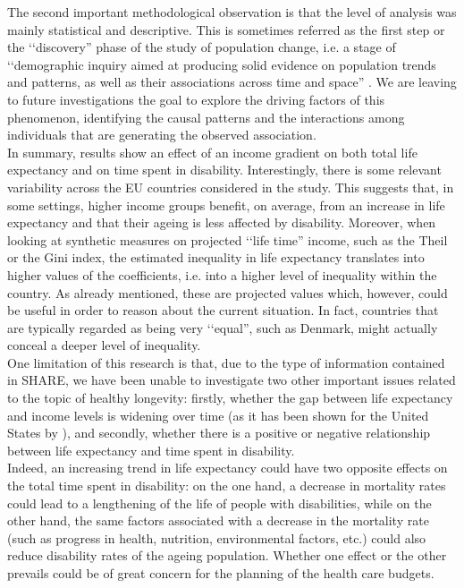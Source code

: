 The second important methodological observation is that the level of analysis was mainly statistical and descriptive. This is sometimes referred as the first step or the \lq\lq discovery'' phase of the study of population change, i.e. a stage of \lq\lq demographic inquiry aimed at producing solid evidence on population trends and patterns, as well as their associations across time and space'' \citep{Billari2015IntegratingChange}. We are leaving to future investigations the goal to explore the driving factors of this phenomenon, identifying the causal patterns and the interactions among individuals that are generating the observed association.\\






In summary, results show an effect of an income gradient on both total life expectancy and on time spent 
in disability. Interestingly, there is some relevant variability across the EU countries considered in the study.
This suggests that, in some settings, higher income groups benefit, on average, from an increase in life expectancy and that their ageing is less affected by disability. Moreover, when looking at synthetic measures on projected \lq\lq life time'' income, such as the Theil or the Gini index, the estimated inequality in life expectancy translates into higher values of the coefficients, i.e. into a higher level of inequality within the country. As already mentioned, these are projected values which, however, could be useful in order to reason about the current situation. In fact, countries that are typically regarded as being very \lq\lq equal'', such as Denmark, might actually conceal a deeper level of inequality.\\



One limitation of this research is that, due to the type of information contained in SHARE, we have been unable to investigate two other important issues related to the topic of healthy longevity: firstly, whether the gap between life expectancy and income levels is widening over time (as it has been shown for the United States by \cite{Auerbach2017}), and secondly, whether there is a positive or negative relationship between life expectancy and time spent in disability.\\

Indeed, an increasing trend in life expectancy could have two opposite effects on the total time spent in disability: on the one hand, a decrease in mortality rates could lead to a lengthening of the life of people with disabilities, while on the other hand, the same factors associated with a decrease in the mortality rate (such as progress in health, nutrition, environmental factors, etc.) could also reduce disability rates of the ageing population.
Whether one effect or the other prevails could be of great concern for the planning of the health care budgets. 




